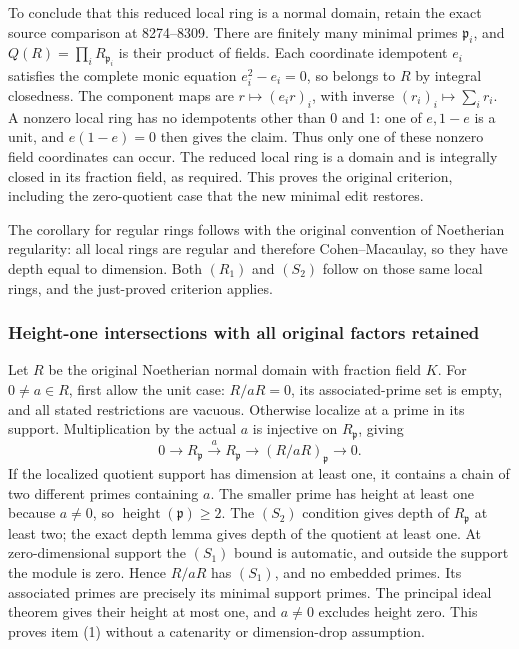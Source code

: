 To conclude that this reduced local ring is a normal domain, retain the exact source comparison at 8274--8309. There are finitely many minimal primes \(\mathfrak p_i\), and \(Q(R)=\prod_iR_{\mathfrak p_i}\) is their product of fields. Each coordinate idempotent \(e_i\) satisfies the complete monic equation \(e_i^2-e_i=0\), so belongs to \(R\) by integral closedness. The component maps are \(r\mapsto(e_ir)_i\), with inverse \((r_i)_i\mapsto\sum_i r_i\). A nonzero local ring has no idempotents other than 0 and 1: one of \(e,1-e\) is a unit, and \(e(1-e)=0\) then gives the claim. Thus only one of these nonzero field coordinates can occur. The reduced local ring is a domain and is integrally closed in its fraction field, as required. This proves the original criterion, including the zero-quotient case that the new minimal edit restores.

The corollary for regular rings follows with the original convention of Noetherian regularity: all local rings are regular and therefore Cohen--Macaulay, so they have depth equal to dimension. Both \((R_1)\) and \((S_2)\) follow on those same local rings, and the just-proved criterion applies.

\subsubsection{Height-one intersections with all original factors retained}\label{height-one-intersections-with-all-original-factors-retained}

Let \(R\) be the original Noetherian normal domain with fraction field \(K\). For \(0\ne a\in R\), first allow the unit case: \(R/aR=0\), its associated-prime set is empty, and all stated restrictions are vacuous. Otherwise localize at a prime in its support. Multiplication by the actual \(a\) is injective on \(R_{\mathfrak p}\), giving \[
 0\longrightarrow R_{\mathfrak p}\xrightarrow{\ a\ }R_{\mathfrak p}
 \longrightarrow (R/aR)_{\mathfrak p}\longrightarrow0.
\] If the localized quotient support has dimension at least one, it contains a chain of two different primes containing \(a\). The smaller prime has height at least one because \(a\ne0\), so \(\operatorname{height}(\mathfrak p)\geq2\). The \((S_2)\) condition gives depth of \(R_{\mathfrak p}\) at least two; the exact depth lemma gives depth of the quotient at least one. At zero-dimensional support the \((S_1)\) bound is automatic, and outside the support the module is zero. Hence \(R/aR\) has \((S_1)\), and no embedded primes. Its associated primes are precisely its minimal support primes. The principal ideal theorem gives their height at most one, and \(a\ne0\) excludes height zero. This proves item (1) without a catenarity or dimension-drop assumption.

